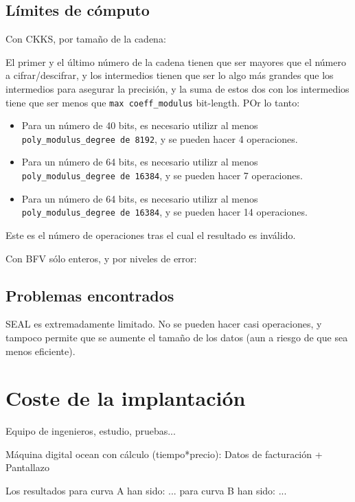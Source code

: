 \subsection{Límites de cómputo}

Con CKKS, por tamaño de la cadena:

El primer y el último número de la cadena tienen que ser mayores que el número a cifrar/descifrar, y los intermedios tienen que ser lo algo más grandes  que los intermedios para asegurar la precisión, y la suma de estos dos con los intermedios tiene que ser menos que  \verb|max coeff_modulus| bit-length. POr lo tanto:

\begin{itemize}
    \item Para un número de 40 bits, es necesario utilizr al menos  \verb|poly_modulus_degree de 8192|, y se pueden hacer 4 operaciones.
    \item Para un número de 64 bits, es necesario utilizr al menos  \verb|poly_modulus_degree de 16384|, y se pueden hacer 7 operaciones.
    \item Para un número de 64 bits, es necesario utilizr al menos \verb|poly_modulus_degree de 16384|, y se pueden hacer 14 operaciones.
\end{itemize}

Este es el número de operaciones tras el cual el resultado es inválido.

Con BFV sólo enteros, y por niveles de error:


\subsection{Problemas encontrados}

SEAL es extremadamente limitado. No se pueden hacer casi operaciones, y tampoco permite que se aumente el tamaño de los datos (aun a riesgo de que sea menos eficiente).

\section{Coste de la implantación}

Equipo de ingenieros, estudio, pruebas...


Máquina digital ocean con cálculo (tiempo*precio): Datos de facturación + Pantallazo

Los resultados para curva A han sido: ...
para curva B han sido: ...
